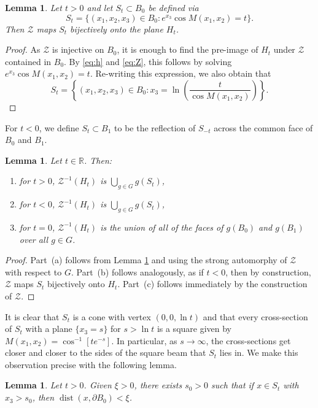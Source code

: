 \documentclass[11pt]{amsart}
\newtheorem{lemma}[theorem]{Lemma}
\numberwithin{equation}{section}
\theoremstyle{definition}
\theoremstyle{definition}
\theoremstyle{definition}
\newcommand{\R}{\mathbb{R}}
\begin{document}
\begin{lemma}
    \label{lem:2}
Let $t>0$ and let $S_t \subset B_0$ be defined via
\[ S_t = \{(x_1,x_2,x_3) \in B_0 : e^{x_3} \cos M(x_1,x_2) = t \}.\]
Then $\mathcal{Z}$ maps $S_t$ bijectively onto the plane $H_t$.
\end{lemma}

\begin{proof}
As $\mathcal{Z}$ is injective on $B_0$, it is enough to find the pre-image of $H_t$ under $\mathcal{Z}$ contained in $B_0$. By \eqref{eq:h} and \eqref{eq:Z}, this follows by solving $e^{x_3} \cos M(x_1,x_2) = t$. Re-writing this expression, we also obtain that
\[ S_t = \left\{(x_1,x_2,x_3) \in B_0 : x_3 = \ln \left ( \frac{t}{\cos M(x_1,x_2) } \right ) \right \}.\]
\end{proof}

For $t<0$, we define $S_t\subset B_1$ to be the reflection of $S_{-t}$ across the common face of $B_0$ and $B_1$.

\begin{lemma}
    \label{lem:3}
Let $t\in \R$. Then:
\begin{enumerate}
\item for $t>0$, $\mathcal{Z}^{-1}(H_t)$ is $\bigcup_{g\in G} g(S_t)$,
\item for $t<0$, $\mathcal{Z}^{-1}(H_t)$ is $\bigcup_{g\in G} g(S_t)$,
\item for $t=0$, $\mathcal{Z}^{-1}(H_t)$ is the union of all of the faces of $g(B_0)$ and $g(B_1)$ over all $g\in G$.    
\end{enumerate}
\end{lemma}

\begin{proof}
Part~(a) follows from Lemma \ref{lem:2} and using the strong automorphy of $\mathcal{Z}$ with respect to $G$. Part~(b) follows analogously, as if $t<0$, then by construction, $\mathcal{Z}$ maps $S_t$ bijectively onto $H_t$. Part~(c) follows immediately by the construction of $\mathcal{Z}$. 
\end{proof}

It is clear that $S_t$ is a cone with vertex $(0,0,\ln t)$ and that every cross-section of $S_t$ with a plane $\{x_3 = s\}$ for $s > \ln t$ is a square given by $M(x_1,x_2) = \cos^{-1}[te^{-s}]$. In particular, as $s\to \infty$, the cross-sections get closer and closer to the sides of the square beam that $S_t$ lies in. We make this observation precise with the following lemma.

\begin{lemma}
\label{lem:squarebeam}
Let $t> 0$. Given $\xi >0$, there exists $s_0 > 0$ such that if $x\in S_t$ with $x_3 > s_0$, then $\operatorname{dist}(x,\partial B_0) < \xi$.
\end{lemma}
\end{document}
